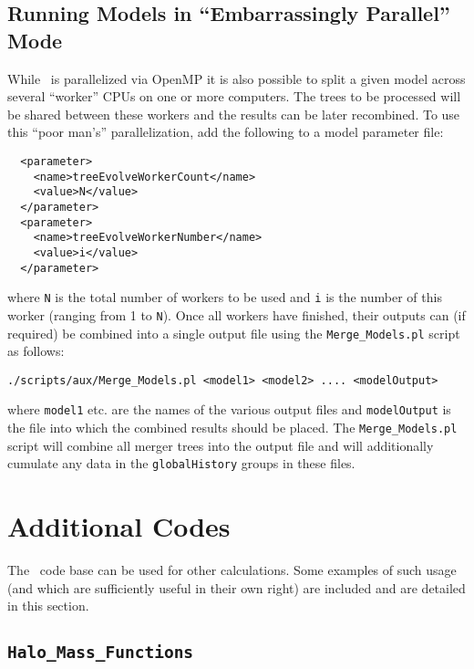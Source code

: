 \subsection{Running Models in ``Embarrassingly Parallel'' Mode}

While \glc\ is parallelized via OpenMP it is also possible to split a given model across several ``worker'' CPUs on one or more computers. The trees to be processed will be shared between these workers and the results can be later recombined. To use this ``poor man's'' parallelization, add the following to a model parameter file:
\begin{verbatim}
  <parameter>
    <name>treeEvolveWorkerCount</name>
    <value>N</value>
  </parameter>
  <parameter>
    <name>treeEvolveWorkerNumber</name>
    <value>i</value>
  </parameter>
\end{verbatim}
where {\tt N} is the total number of workers to be used and {\tt i} is the number of this worker (ranging from 1 to {\tt N}). Once all workers have finished, their outputs can (if required) be combined into a single output file using the {\tt Merge\_Models.pl} script as follows:
\begin{verbatim}
./scripts/aux/Merge_Models.pl <model1> <model2> .... <modelOutput>
\end{verbatim}
where {\tt model1} etc. are the names of the various output files and {\tt modelOutput} is the file into which the combined results should be placed. The {\tt Merge\_Models.pl} script will combine all merger trees into the output file and will additionally cumulate any data in the {\tt globalHistory} groups in these files.

\section{Additional Codes}

The \glc\ code base can be used for other calculations. Some examples of such usage (and which are sufficiently useful in their own right) are included and are detailed in this section.

\subsection{{\tt Halo\_Mass\_Functions}}


